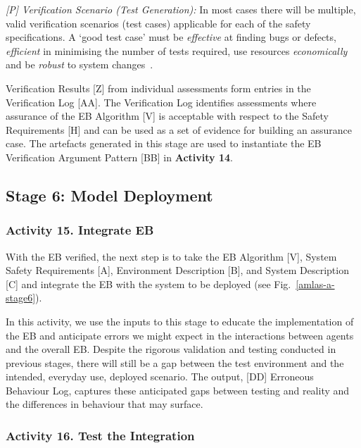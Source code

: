 \documentclass[runningheads]{llncs}
\begin{document}
\emph{[P] Verification Scenario (Test Generation):} In most cases there will be multiple, valid verification scenarios (test cases) applicable for each of the safety specifications. A `good test case' must be \emph{effective} at finding bugs or defects, \emph{efficient} in minimising the number of tests required, use resources \emph{economically} and be \emph{robust} to system changes~\cite{Fewster1999}. 

Verification Results [Z] from individual assessments form entries in the Verification Log [AA]. The Verification Log identifies assessments where assurance of the EB Algorithm [V] is acceptable with respect to the Safety Requirements [H] and can be used as a set of evidence for building an assurance case.%
The artefacts generated in this stage are used to instantiate the EB Verification Argument Pattern [BB] in \textbf{Activity 14}.


\subsection{Stage 6: Model Deployment} \label{framework-stage6}
\subsubsection*{Activity 15. Integrate EB}

With the EB verified, the next step is to take the EB Algorithm [V], System Safety Requirements [A], Environment Description [B], and System Description [C] and integrate the EB with the system to be deployed (see Fig.~\ref{amlas-a-stage6}). 

In this activity, we use the inputs to this stage to educate the implementation of the EB and anticipate errors we might expect in the interactions between agents and the overall EB. Despite the rigorous validation and testing conducted in previous stages, there will still be a gap between the test environment and the intended, everyday use, deployed scenario. The output, [DD] Erroneous Behaviour Log, captures these anticipated gaps between testing and reality and the differences in behaviour that may surface. 

\subsubsection*{Activity 16. Test the Integration}
\end{document}
